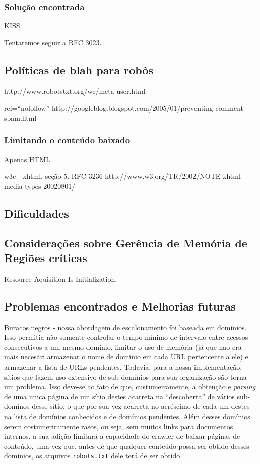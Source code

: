 \documentclass[10pt,twocolumn]{article}
\begin{document}
\subsubsection{Solução encontrada}

KISS.

Tentaremos seguir a RFC 3023.
\subsection{Políticas de blah para robôs}
http://www.robotstxt.org/wc/meta-user.html

rel=``nofollow'' http://googleblog.blogspot.com/2005/01/preventing-comment-spam.html  



\subsubsection{Limitando o conteúdo baixado}

Apenas HTML 

w3c - xhtml, seção 5.
RFC 3236
http://www.w3.org/TR/2002/NOTE-xhtml-media-types-20020801/

\subsection{Dificuldades}

\subsection{Considerações sobre Gerência de Memória de Regiões críticas}

Resource Aquisition Is Initialization.

\subsection{Problemas encontrados e Melhorias futuras}

Buracos negros - nossa abordagem de escalonamento foi baseada em domínios. Isso
permitia não somente controlar o tempo mínimo de intervalo entre acessos
consecutívos a um mesmo domínio, limitar o uso de memória (já que nao era mais
necesári armazenar o nome de domínio em cada URL pertencente a ele) e armazenar
a lista de URLs pendentes. Todavia, para a nossa implementação, sítios que
fazem uso extensivo de sub-domínios para sua organização são torna um problema.
Isso deve-se ao fato de que, custumeiramente, a obtenção e \emph{parsing} de
uma unica página de um sítio destes acarreta na ``descoberta'' de vários
sub-domínos desse sítio, o que por sua vez acarreta no acréscimo de cada um
destes na lista de domínios conhecidos e de domínios pendentes. Além desses
domínios serem costumeriramente rasos, ou seja, sem muitos links para
documentos internos, a sua adição limitará a capacidade do crawler de baixar
páginas de conteúdo, uma vez que, antes de que qualquer conteúdo possa ser
obtido desses domínios, os arquivos \texttt{robots.txt} dele terá de ser
obtido.
\end{document}
